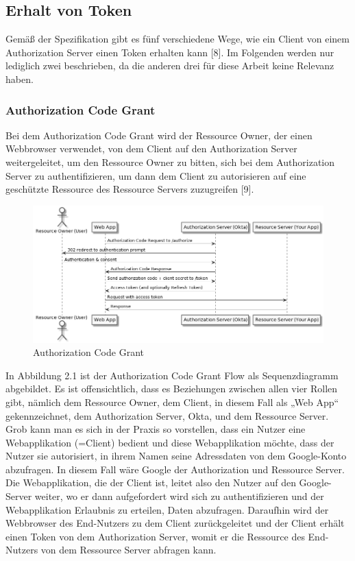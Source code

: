 \subsection{Erhalt von Token}
\label{subsec:background:second_section:second_subsection}

Gemäß der Spezifikation gibt es fünf verschiedene Wege, wie ein Client von einem Authorization Server einen Token erhalten kann [8]. Im Folgenden werden nur lediglich zwei beschrieben, da die anderen drei für diese Arbeit keine Relevanz haben. 

\subsubsection{Authorization Code Grant}
\label{ssubsec:background:second_section:first_subsection:first_subsubsection}
Bei dem Authorization Code Grant wird der Ressource Owner, der einen Webbrowser verwendet, von dem Client auf den Authorization Server weitergeleitet, um den Ressource Owner zu bitten, sich bei dem Authorization Server zu authentifizieren, um dann dem Client zu autorisieren auf eine geschützte Ressource des Ressource Servers zuzugreifen [9]. 

\begin{figure}[htbp]
  \centering
  \includegraphics[width=1.0\textwidth]{gfx/oauth_auth_code_flow.png}
  \caption{Authorization Code Grant}
  \label{fig:chapter02:oauth_auth_code_flow}
 \end{figure}

In Abbildung 2.1 ist der Authorization Code Grant Flow als Sequenzdiagramm abgebildet. Es ist offensichtlich, dass es Beziehungen zwischen allen vier Rollen gibt, nämlich dem Ressource Owner, dem Client, in diesem Fall als „Web App“ gekennzeichnet, dem Authorization Server, Okta, und dem Ressource Server. 
Grob kann man es sich in der Praxis so vorstellen, dass ein Nutzer eine Webapplikation (=Client) bedient und diese Webapplikation möchte, dass der Nutzer sie autorisiert, in ihrem Namen seine Adressdaten von dem Google-Konto abzufragen. In diesem Fall wäre Google der Authorization und Ressource Server. Die Webapplikation, die der Client ist, leitet also den Nutzer auf den Google-Server weiter, wo er dann aufgefordert wird sich zu authentifizieren und der Webapplikation Erlaubnis zu erteilen, Daten abzufragen. Daraufhin wird der Webbrowser des End-Nutzers zu dem Client zurückgeleitet und der Client erhält einen Token von dem Authorization Server, womit er die Ressource des End-Nutzers von dem Ressource Server abfragen kann. 

